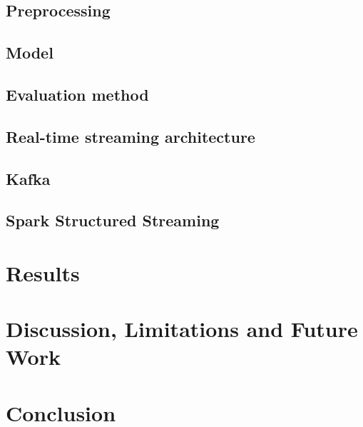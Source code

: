 \documentclass{article}
\begin{document}
\subsection{Preprocessing}
\subsection{Model}
\subsection{Evaluation method}

\subsection{Real-time streaming architecture}
\subsection{Kafka}
\subsection{Spark Structured Streaming}

\section{Results}

\section{Discussion, Limitations and Future Work}
\section{Conclusion}

\printbibliography
\end{document}
